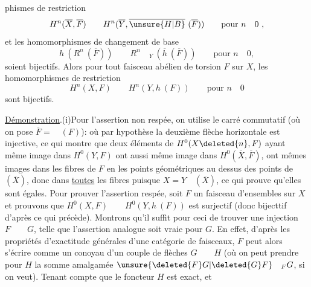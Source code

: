
phismes de restriction
\[
H^n(\overline{X},\overline{F})\qquad H^n(\overline{Y},\overline{\unsure{H|B}}\ (\overline{F}))\qquad\text{pour }n\quad0\ ,
\]
et les homomorphismes de changement de base
\[
h\ (R^n\ (\overline{F}))\qquad R^n\quad{}_{Y}\ (\overline{h}\ (\overline{F}))\qquad\text{pour }n\quad0,
\]
soient bijectifs. Alors pour tout faisceau abélien de torsion $F$ sur $X$, les homomorphismes de restriction
\[
H^n(X,F)\qquad H^n(Y,h\ (F))\qquad\text{pour }n\quad0
\]
sont  bijectifs.

\uline{Démonstration}.\quad (i)\quad Pour l'assertion non respée, on utilise le carré commutatif (où on pose $\overline{F}=\quad(F)$):
où par hypothèse la deuxième flèche horizontale est injective, ce qui montre que deux éléments de $H^0(X\deleted{n},F)$ ayant même image dans $H^0(Y,F)$ ont aussi même image dans $H^0(\overline{X},\overline{F})$,  ont mêmes images dans les fibres  de $F$ en les points géométriques au dessus des points de $(\overline{X})$, donc dans \uline{toutes} les fibres puisque $X=Y\quad(\overline{X})$, ce qui prouve qu'elles sont égales. Pour prouver l'assertion respée, soit $F$ un faisceau d'ensembles sur $X$ et prouvons que $H^0(X,F)\qquad H^0(Y,h\ (F))$ est surjectif (donc bijecttif d'après ce qui précède). Montrons qu'il suffit pour ceci de trouver une injection $F\qquad G$, telle que l'assertion analogue soit vraie pour $G$. En effet, d'après les propriétés d'exactitude générales d'une catégorie de faisceaux, $F$ peut alors s'écrire comme un conoyau d'un couple de flèches $G\qquad H$ (où on peut prendre pour $H$ la somme amalgamée $\unsure{\deleted{F}G|\deleted{G}F}\quad{}_{F}G$, si on veut). Tenant compte que le foncteur $H$ est exact,  et
